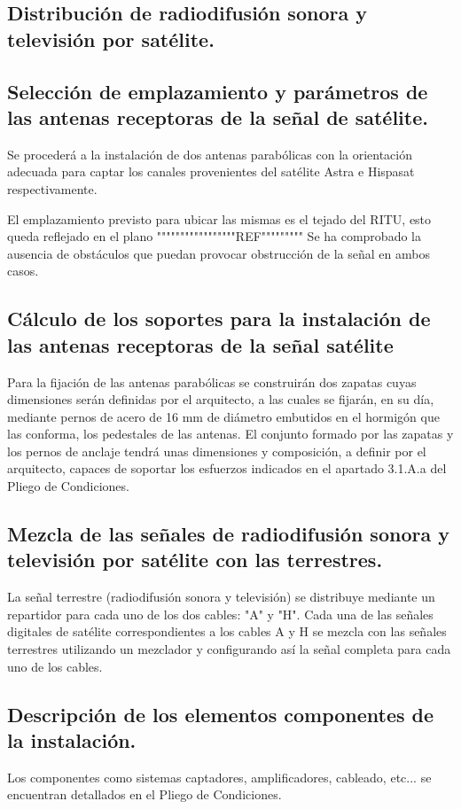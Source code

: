 \subsection{Distribución de radiodifusión sonora y televisión por satélite.}

\subsection{Selección de emplazamiento y parámetros de las antenas receptoras de la señal de satélite.}

Se procederá a la instalación de dos antenas parabólicas con la orientación adecuada para captar los canales provenientes del satélite Astra e Hispasat respectivamente.

El emplazamiento previsto para ubicar las mismas es el tejado del RITU, esto queda reflejado en el plano """""""""""""""""REF"""""""""
Se ha comprobado la ausencia de obstáculos que puedan provocar obstrucción de la señal en ambos casos.


\subsection{Cálculo de los soportes para la instalación de las antenas receptoras de la señal satélite}

Para la fijación de las antenas parabólicas se construirán dos zapatas cuyas dimensiones serán definidas por el arquitecto, a las cuales se fijarán, en su día, mediante pernos de acero de 16 mm de diámetro embutidos en el hormigón que las conforma, los pedestales de las antenas.
El conjunto formado por las zapatas y los pernos de anclaje tendrá unas dimensiones y composición, a definir por el arquitecto, capaces de soportar los esfuerzos indicados en el apartado 3.1.A.a del Pliego de Condiciones.


\subsection{Mezcla de las señales de radiodifusión sonora y televisión por satélite con las terrestres.}

La señal terrestre (radiodifusión sonora y televisión) se distribuye mediante un repartidor para cada uno de los dos cables: "A" y "H". Cada una de las señales digitales de satélite correspondientes a los cables A y H se mezcla con las señales terrestres utilizando un mezclador y configurando así la señal completa para cada uno de los cables.

\subsection{Descripción de los elementos componentes de la instalación.}
Los componentes como sistemas captadores, amplificadores, cableado, etc... se encuentran detallados en el Pliego de Condiciones.
